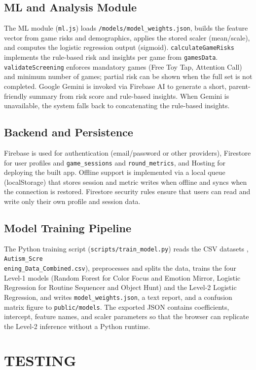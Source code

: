 \documentclass[12pt,a4paper]{report}
\begin{document}
\section{ML and Analysis Module}
The ML module (\texttt{ml.js}) loads \texttt{/models/model\_weights.json}, builds the feature vector from game risks and demographics, applies the stored scaler (mean/scale), and computes the logistic regression output (sigmoid). \texttt{calculateGameRisks} implements the rule-based risk and insights per game from \texttt{gamesData}. \texttt{validateScreening} enforces mandatory games (Free Toy Tap, Attention Call) and minimum number of games; partial risk can be shown when the full set is not completed. Google Gemini is invoked via Firebase AI to generate a short, parent-friendly summary from risk score and rule-based insights. When Gemini is unavailable, the system falls back to concatenating the rule-based insights.
\section{Backend and Persistence}
Firebase is used for authentication (email/password or other providers), Firestore for user profiles and \texttt{game\_sessions} and \texttt{round\_metrics}, and Hosting for deploying the built app. Offline support is implemented via a local queue (localStorage) that stores session and metric writes when offline and syncs when the connection is restored. Firestore security rules ensure that users can read and write only their own profile and session data.
\section{Model Training Pipeline}
The Python training script (\texttt{scripts/train\_model.py}) reads the CSV datasets , \texttt{Autism\_Scre\\ening\_Data\_Combined.csv}), preprocesses and splits the data, trains the four Level-1 models (Random Forest for Color Focus and Emotion Mirror, Logistic Regression for Routine Sequencer and Object Hunt) and the Level-2 Logistic Regression, and writes \texttt{model\_weights.json}, a text report, and a confusion matrix figure to \texttt{public/models}. The exported JSON contains coefficients, intercept, feature names, and scaler parameters so that the browser can replicate the Level-2 inference without a Python runtime.
\chapter{TESTING}
\end{document}

